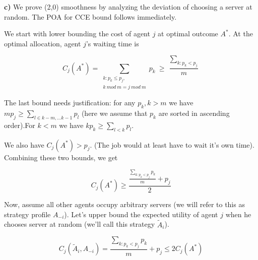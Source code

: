 \textbf{c)} We prove (2,0) smoothness by analyzing the deviation of choosing a server at random. The POA for CCE bound follows immediately.


We start with lower bounding the cost of agent $j$ at optimal outcome $A^*$. At the optimal allocation, agent $j$'s waiting time is

$$C_j(A^*) = \sum_{\substack{k: p_k \leq p_j,\\ k\ mod\ m = j\ mod\ m}} p_k\ \geq\  \frac{\sum_{k: p_k < p_j}}{m} $$

The last bound needs justification: for any $p_k,k>m$ we have $mp_j\geq \sum_{l\in {k-m,...k-1}} p_l $ (here we assume that $p_k$ are sorted in ascending order).For $k<m$ we have $kp_k\geq \sum_{l<k} p_l$. 

We also have $C_j(A^*)>p_j$. (The job would at least have to wait it's own time). Combining these two bounds, we get

$$C_j(A^*)\geq \frac{\frac{\sum_{k: p_k < p_j}  p_k}{m} + p_j}{2}$$

Now, assume all other agents occupy arbitrary servers (we will refer to this as strategy profile $A_{-i}$). Let's upper bound the expected utility of agent $j$ when he chooses server at random (we'll call this strategy $\tilde A_i$). 

$$
C_j(\tilde A_i,A_{-i}) =  \frac{\sum_{k: p_k < p_j}  p_k}{m} + p_j \leq 2C_j(A^*)
$$

%
%
%
%
%
%
%
%
%
